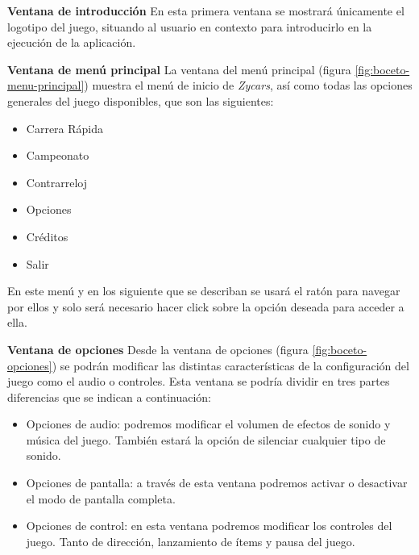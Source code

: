 \begin{description}
    \item \textbf{Ventana de introducción} En esta primera ventana se mostrará únicamente el logotipo del juego, situando al usuario en
    contexto para introducirlo en la ejecución de la aplicación.
    
    \item \textbf{Ventana de menú principal} La ventana del menú principal (figura \ref{fig:boceto-menu-principal})
    muestra el menú de inicio de \emph{Zycars}, así como 
    todas las opciones generales del juego disponibles, que son las siguientes:
        \begin{itemize}
            \item Carrera Rápida
            \item Campeonato
            \item Contrarreloj
            \item Opciones
            \item Créditos
            \item Salir
        \end{itemize}
        En este menú y en los siguiente que se describan se usará el ratón para navegar por ellos y solo será necesario
        hacer click sobre la opción deseada para acceder a ella.

    
    \item \textbf{Ventana de opciones} Desde la ventana de opciones (figura \ref{fig:boceto-opciones}) se podrán
    modificar las distintas características de la 
    configuración del juego como el audio o controles. Esta ventana se podría dividir en tres partes diferencias que se indican
    a continuación:
        \begin{itemize}
            \item Opciones de audio: podremos modificar el volumen de efectos de sonido y música del juego. También estará la opción
            de silenciar cualquier tipo de sonido.
            
            \item Opciones de pantalla: a través de esta ventana podremos activar o desactivar el modo de pantalla completa.
            
            \item Opciones de control: en esta ventana podremos modificar los controles del juego. Tanto de dirección, lanzamiento
            de ítems y pausa del juego.
        \end{itemize}


\end{description}
